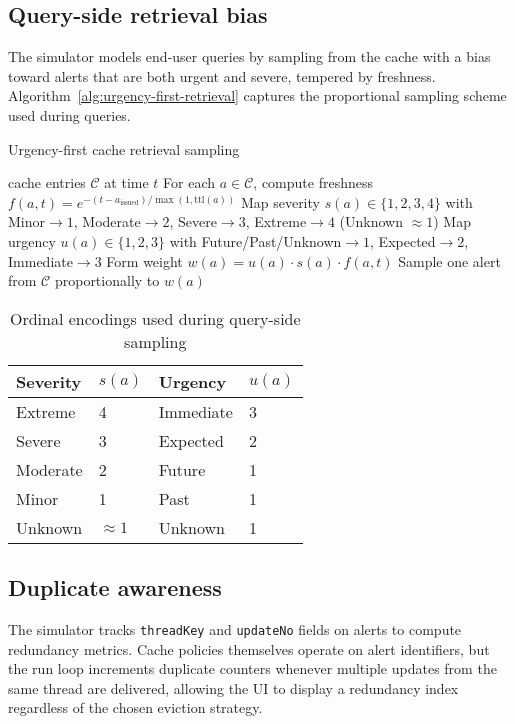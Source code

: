 \subsection{Query-side retrieval bias}
The simulator models end-user queries by sampling from the cache with a bias toward alerts that are both urgent and severe, tempered by freshness. Algorithm~\ref{alg:urgency-first-retrieval} captures the proportional sampling scheme used during queries.

\begin{algorithm}[t]
\caption{Urgency-first cache retrieval sampling}
\label{alg:urgency-first-retrieval}
\begin{algorithmic}[1]
\REQUIRE cache entries $\mathcal{C}$ at time $t$
\STATE For each $a\in\mathcal{C}$, compute freshness $f(a,t)=e^{-(t-a_{\text{issued}})/\max(1,\text{ttl}(a))}$
\STATE Map severity $s(a)\in\{1,2,3,4\}$ with Minor$\to 1$, Moderate$\to 2$, Severe$\to 3$, Extreme$\to 4$ (Unknown $\approx 1$)
\STATE Map urgency $u(a)\in\{1,2,3\}$ with Future/Past/Unknown$\to 1$, Expected$\to 2$, Immediate$\to 3$
\STATE Form weight $w(a)=u(a)\cdot s(a)\cdot f(a,t)$
\STATE Sample one alert from $\mathcal{C}$ proportionally to $w(a)$
\end{algorithmic}
\end{algorithm}

\begin{table}[t]
\centering
\caption{Ordinal encodings used during query-side sampling}
\label{tab:ordinals}
\begin{tabular}{ll|ll}
Severity & $s(a)$ & Urgency & $u(a)$ \\
\midrule
Extreme & 4 & Immediate & 3 \\
Severe & 3 & Expected & 2 \\
Moderate & 2 & Future & 1 \\
Minor & 1 & Past & 1 \\
Unknown & $\approx 1$ & Unknown & 1 \\
\bottomrule
\end{tabular}
\end{table}

\subsection{Duplicate awareness}
The simulator tracks \texttt{threadKey} and \texttt{updateNo} fields on alerts to compute redundancy metrics. Cache policies themselves operate on alert identifiers, but the run loop increments duplicate counters whenever multiple updates from the same thread are delivered, allowing the UI to display a redundancy index regardless of the chosen eviction strategy.

